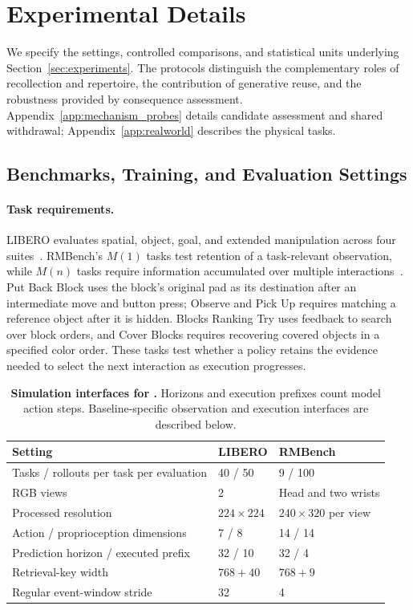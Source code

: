 \section{Experimental Details}
\label{app:protocols}

We specify the settings, controlled comparisons, and statistical units underlying Section~\ref{sec:experiments}.
The protocols distinguish the complementary roles of recollection and repertoire, the contribution of generative reuse, and the robustness provided by consequence assessment.
Appendix~\ref{app:mechanism_probes} details candidate assessment and shared withdrawal; Appendix~\ref{app:realworld} describes the physical tasks.

\subsection{Benchmarks, Training, and Evaluation Settings}
\label{app:baseline_sources}

\paragraph{Task requirements.}
LIBERO evaluates spatial, object, goal, and extended manipulation across four suites~\citep{liu2023libero}.
RMBench's $M(1)$ tasks test retention of a task-relevant observation, while $M(n)$ tasks require information accumulated over multiple interactions~\citep{chen2026rmbench}.
Put Back Block uses the block's original pad as its destination after an intermediate move and button press; Observe and Pick Up requires matching a reference object after it is hidden.
Blocks Ranking Try uses feedback to search over block orders, and Cover Blocks requires recovering covered objects in a specified color order.
These tasks test whether a policy retains the evidence needed to select the next interaction as execution progresses.

\begin{table}[H]
\centering\small
\caption{\textbf{Simulation interfaces for \method{}.} Horizons and execution prefixes count model action steps. Baseline-specific observation and execution interfaces are described below.}
\label{tab:contracts}
\begin{tabularx}{\linewidth}{@{}lXX@{}}
\toprule
Setting & LIBERO & RMBench \\
\midrule
Tasks / rollouts per task per evaluation & 40 / 50 & 9 / 100 \\
RGB views & 2 & Head and two wrists \\
Processed resolution & $224\times224$ & $240\times320$ per view \\
Action / proprioception dimensions & 7 / 8 & 14 / 14 \\
Prediction horizon / executed prefix & 32 / 10 & 32 / 4 \\
Retrieval-key width & $768+40$ & $768+9$ \\
Regular event-window stride & 32 & 4 \\
\bottomrule
\end{tabularx}
\end{table}

